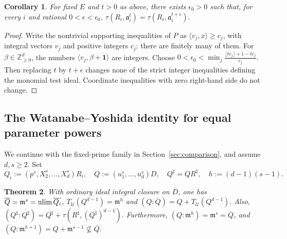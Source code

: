 \documentclass[11pt,a4paper]{amsart}
\numberwithin{equation}{section}
\newtheorem{theorem}{Theorem}[section]
\newtheorem{corollary}[theorem]{Corollary}
\newcommand{\U}{\mathcal{U}}
\newcommand{\mm}{\mathfrak m}
\newcommand{\ideal}{\mathfrak a}
\newcommand{\NN}{\mathbb Z_{\geq0}}
\newcommand{\one}{\mathbf 1}
\newcommand{\cl}[1]{\overline{#1}}
\begin{document}
 
 
 \begin{corollary}
 	For fixed $E$ and $t>0$ as above, there exists $\epsilon_0>0$
 	such that, for every $i$ and rational $0<\epsilon<\epsilon_0$,
 $\tau(R_i,\ideal_i^t)=\tau(R_i,\ideal_i^{t+\epsilon}).$
 \end{corollary}
 
 \begin{proof}
 	Write the nontrivial supporting inequalities of $P$ as
 	$\langle v_j,x\rangle\geq c_j$, with integral vectors $v_j$ and
 	positive integers $c_j$; there are finitely many of them.
 	For $\beta\in\NN^d$, the numbers
 	$\langle v_j,\beta+\one\rangle$ are integers. Choose
 $	0<\epsilon_0<
 	\min_j\frac{\lfloor tc_j\rfloor+1-tc_j}{c_j}.$
 	Then replacing $t$ by $t+\epsilon$ changes none of the strict
 	integer inequalities defining the monomial test ideal.
 	Coordinate inequalities with zero right-hand side do not change.
 \end{proof}
 
 \subsection{The Watanabe--Yoshida identity for equal parameter powers}
 
We continue with the fixed-prime family in
 Section~\ref{sec:comparison}, and assume $d,s\geq2$. Set
 $$
 Q_i:=(p^s,X_2^s,\ldots,X_d^s)R_i,
 \quad Q:=(u_1^s,\ldots,u_d^s)D,
 \quad Q^\sharp=QR^\sharp,
 \quad h:=(d-1)(s-1).
 $$
 
 \begin{theorem}\label{thm:WY2}
 	With ordinary ideal integral closure on $D$, one has
 $	\cl Q=\mm^s=\ulim\cl{Q_i}$, 
$T_{\U}(Q^{d-1})=\mm^h$ and
${( Q:\cl Q)=Q+T_{\U}(Q^{d-1}).}$
Also, $
  {(Q^\sharp:\cl{Q^\sharp})
 		=Q^\sharp+\tau(R^\sharp,(Q^\sharp)^{d-1}).} $
 	Furthermore,
 	$ (	Q:\mm^h)=\mm^s=	\cl Q$, and $(Q:\mm^{h+1})=Q+\mm^{s-1}\not\subseteq\cl Q. $
 \end{theorem}
 
\end{document}
